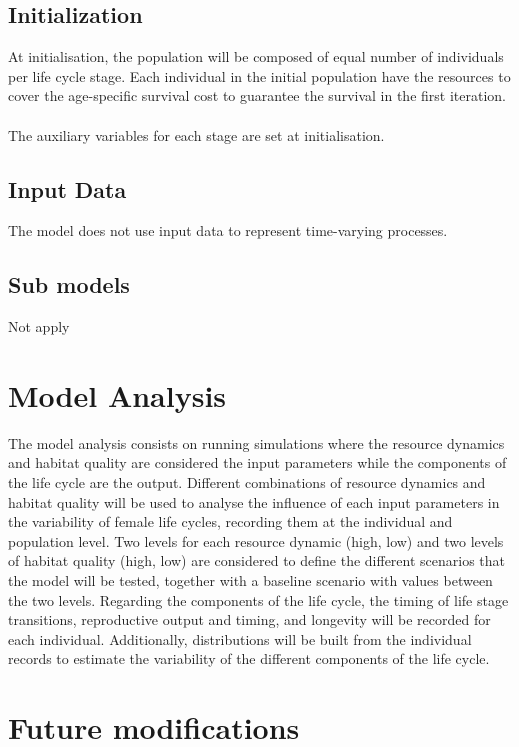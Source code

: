 \documentclass{article}
\begin{document}
\subsection{Initialization}

At initialisation, the population will be composed of equal number of individuals per life cycle stage. Each individual in the initial population have the resources to cover the age-specific survival cost to guarantee the survival in the first iteration.
\\\\
The auxiliary variables for each stage are set at initialisation.

\subsection{Input Data}

The model does not use input data to represent time-varying processes.

\subsection{Sub models}

Not apply

\section{Model Analysis}

The model analysis consists on running simulations where the resource dynamics and habitat quality are considered the input parameters while the components of the life cycle are the output. Different combinations of resource dynamics and habitat quality will be used to analyse the influence of each input parameters in the variability of female life cycles, recording them at the individual and population level. Two levels for each resource dynamic (high, low) and two levels of habitat quality (high, low) are considered to define the different scenarios that the model will be tested, together with a baseline scenario with values between the two levels. Regarding the components of the life cycle, the timing of life stage transitions, reproductive output and timing, and longevity will be recorded for each individual. Additionally, distributions will be built from the individual records to estimate the variability of the different components of the life cycle.

\section{Future modifications}
\end{document}
